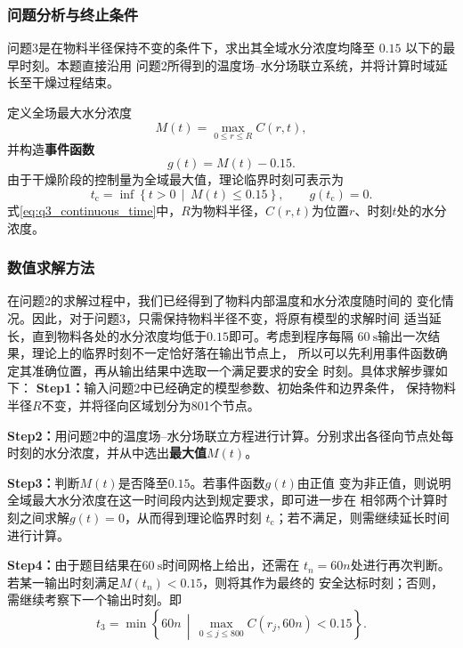 \documentclass[12pt,a4paper,fontset=none]{ctexart}
\begin{document}
\subsubsection{问题分析与终止条件}

问题3是在物料半径保持不变的条件下，求出其全域水分浓度均降至
$0.15$ 以下的最早时刻。本题直接沿用
问题2所得到的温度场--水分场联立系统，并将计算时域延长至干燥过程结束。

定义全场最大水分浓度
\begin{equation}
M(t)=\max_{0\leq r\leq R}C(r,t),
\label{eq:q3_max_concentration}
\end{equation}
并构造\textbf{事件函数}
\begin{equation}
g(t)=M(t)-0.15.
\label{eq:q3_event}
\end{equation}
由于干燥阶段的控制量为全域最大值，理论临界时刻可表示为
\begin{equation}
t_{\mathrm{c}}
=\inf\left\{t>0\,\middle|\,M(t)\leq 0.15\right\},
\qquad g\!\left(t_{\mathrm{c}}\right)=0.
\label{eq:q3_continuous_time}
\end{equation}
式\eqref{eq:q3_continuous_time}中，$R$为物料半径，$C(r,t)$为位置$r$、时刻$t$处的水分浓度。

\subsubsection{数值求解方法}

在问题2的求解过程中，我们已经得到了物料内部温度和水分浓度随时间的
变化情况。因此，对于问题3，只需保持物料半径不变，将原有模型的求解时间
适当延长，直到物料各处的水分浓度均低于$0.15$即可。考虑到程序每隔
$60\ \mathrm{s}$输出一次结果，理论上的临界时刻不一定恰好落在输出节点上，
所以可以先利用事件函数确定其准确位置，再从输出结果中选取一个满足要求的安全
时刻。具体求解步骤如下：
\newline
\noindent\textbf{Step1：}输入问题2中已经确定的模型参数、初始条件和边界条件，
保持物料半径$R$不变，并将径向区域划分为801个节点。

\noindent\textbf{Step2：}用问题2中的温度场--水分场联立方程进行计算。分别求出各径向节点处每时刻的水分浓度，并从中选出\textbf{最大值}$M(t)$。

\noindent\textbf{Step3：}判断$M(t)$是否降至$0.15$。若事件函数$g(t)$由正值
变为非正值，则说明全域最大水分浓度在这一时间段内达到规定要求，即可进一步在
相邻两个计算时刻之间求解$g(t)=0$，从而得到理论临界时刻
$t_{\mathrm{c}}$；若不满足，则需继续延长时间进行计算。

\noindent\textbf{Step4：}由于题目结果在$60\ \mathrm{s}$时间网格上给出，还需在
$t_n=60n$处进行再次判断。若某一输出时刻满足$M(t_n)<0.15$，则将其作为最终的
安全达标时刻；否则，需继续考察下一个输出时刻。即
\begin{equation}
t_3=\min\left\{60n\,\middle|\,
\max_{0\leq j\leq800}C(r_j,60n)<0.15\right\}.
\label{eq:q3_safe_time}
\end{equation}
\end{document}
